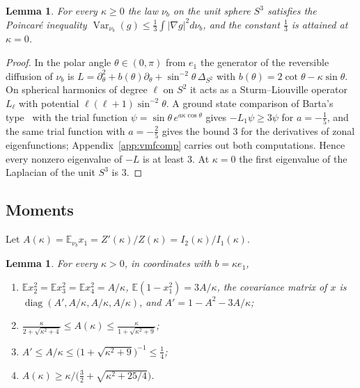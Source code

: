 \documentclass[11pt]{amsart}
\newtheorem{lemma}[theorem]{Lemma}
\theoremstyle{definition}
\theoremstyle{remark}
\numberwithin{equation}{section}
\newcommand{\E}{\mathbb{E}}
\newcommand{\Var}{\operatorname{Var}}
\begin{document}
\begin{lemma}\label{q-lem:vmf}
For every $\kappa\ge0$ the law $\nu_b$ on the unit sphere $S^3$ satisfies
the Poincar\'e inequality $\Var_{\nu_b}(g)\le\frac13\int|\nabla g|^2d\nu_b$,
and the constant $\frac13$ is attained at $\kappa=0$.
\end{lemma}

\begin{proof}
In the polar angle $\theta\in(0,\pi)$ from $e_1$ the generator of the
reversible diffusion of $\nu_b$ is $L=\partial_\theta^2+b(\theta)
\partial_\theta+\sin^{-2}\theta\,\Delta_{S^2}$ with $b(\theta)=2\cot\theta-
\kappa\sin\theta$. On spherical harmonics of degree $\ell$ on $S^2$ it acts as
a Sturm--Liouville operator $L_\ell$ with potential
$\ell(\ell+1)\sin^{-2}\theta$. A ground state comparison of Barta's
type~\cite{Bar37} with the trial function $\psi=\sin\theta\,
e^{a\kappa\cos\theta}$ gives $-L_1\psi\ge3\psi$ for $a=-\frac15$, and the same
trial function with $a=-\frac25$ gives the bound $3$ for the derivatives of
zonal eigenfunctions; Appendix~\ref{app:vmfcomp} carries out both computations.
Hence every nonzero eigenvalue of $-L$ is at least $3$. At $\kappa=0$ the
first eigenvalue of the Laplacian of the unit $S^3$ is $3$.
\end{proof}

\subsection{Moments}

Let $A(\kappa)=\E_{\nu_b}x_1=Z'(\kappa)/Z(\kappa)=I_2(\kappa)/I_1(\kappa)$.

\begin{lemma}\label{q-lem:moments}
For every $\kappa>0$, in coordinates with $b=\kappa e_1$,
\begin{enumerate}[label=\textup{(\roman*)},leftmargin=*]
\item $\E x_2^2=\E x_3^2=\E x_4^2=A/\kappa$, $\E(1-x_1^2)=3A/\kappa$, the
covariance matrix of $x$ is $\operatorname{diag}(A',A/\kappa,A/\kappa,
A/\kappa)$, and $A'=1-A^2-3A/\kappa$;
\item $\displaystyle\frac{\kappa}{2+\sqrt{\kappa^2+4}}\le
A(\kappa)\le\frac{\kappa}{1+\sqrt{\kappa^2+9}}$;
\item $A'\le A/\kappa\le\bigl(1+\sqrt{\kappa^2+9}\bigr)^{-1}\le\frac14$;
\item $A(\kappa)\ge\kappa\big/\bigl(\frac32+\sqrt{\kappa^2+25/4}\bigr)$.
\end{enumerate}
\end{lemma}
\end{document}
